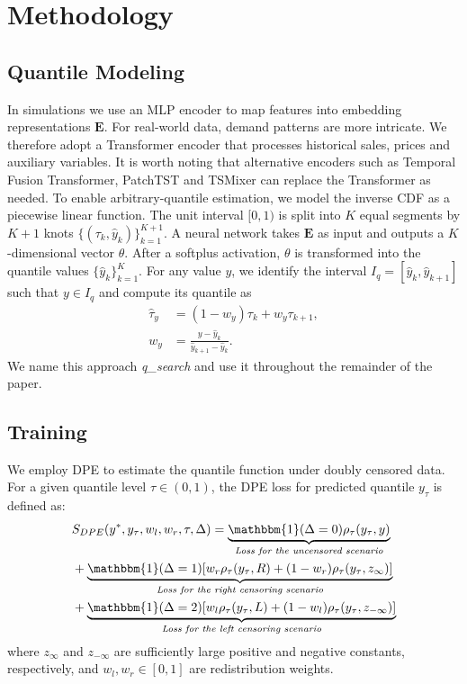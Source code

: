 \documentclass[sigconf]{acmart}
\begin{document}
\section{Methodology}
\subsection{Quantile Modeling}
In simulations we use an MLP encoder to map features into embedding representations $\mathbf{E}$. For real-world data, demand patterns are more intricate. We therefore adopt a Transformer encoder that processes historical sales, prices and auxiliary variables. It is worth noting that alternative encoders such as Temporal Fusion Transformer\citep{lim2021temporal}, PatchTST\citep{nie2022time} and TSMixer\citep{chen2023tsmixer} can replace the Transformer as needed. To enable arbitrary-quantile estimation, we model the inverse CDF as a piecewise linear function. The unit interval $[0,1)$ is split into $K$ equal segments by $K+1$ knots $\{(\tau_k, \hat{y}_k)\}_{k=1}^{K+1}$. A neural network takes $\mathbf{E}$ as input and outputs a $K$-dimensional vector $\theta$. After a softplus activation, $\theta$ is transformed into the quantile values $\{\hat{y}_{k}\}_{k=1}^{K}$. For any value $y$, we identify the interval $I_q=[\hat{y}_k,\hat{y}_{k+1}]$ such that $y \in I_q$ and compute its quantile as
\begin{align*}
\hat{\tau}_y &= (1 - w_y)\tau_k + w_y\tau_{k+1}, \\
w_y &= \frac{y - \hat{y}_{k}}{\hat{y}_{k+1} - \hat{y}_{k}}.
\end{align*}
We name this approach \textit{q\_search} and use it throughout the remainder of the paper.

\subsection{Training}


We employ DPE to estimate the quantile function under doubly censored data. For a given quantile level $\tau \in (0,1)$, the DPE loss for predicted quantile $y_\tau$ is defined as:
\begin{align*}
\begin{split}
&S_{DPE}(y^{*}, {y}_\tau, w_l, w_r, \tau, \Delta)  = \underbrace{ \mathbbm{1}(\Delta = 0) \rho_\tau({y}_\tau, y)}_{\textit{Loss for the uncensored scenario}} \\
        &  +\underbrace{ \mathbbm{1}(\Delta = 1)[w_r\rho_\tau({y}_\tau, R) + (1 - w_r)\rho_\tau({y}_\tau, z_{\infty})]}_{\textit{Loss for the right censoring scenario}} \\
        &  +\underbrace{ \mathbbm{1}(\Delta = 2)[w_l\rho_\tau({y}_\tau, L) + (1 - w_l)\rho_\tau({y}_\tau, z_{-\infty})]}_{\textit{Loss for the left censoring scenario}}
\end{split}
\end{align*}
where $z_\infty$ and $z_{-\infty}$ are sufficiently large positive and negative constants, respectively, and $w_l, w_r \in [0,1]$ are redistribution weights.
\end{document}

